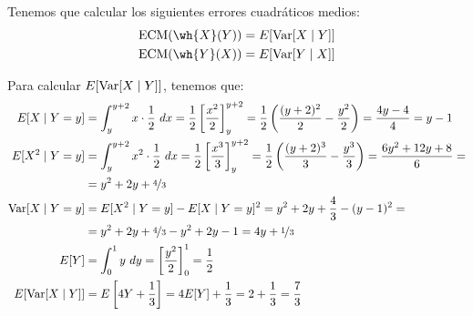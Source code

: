 \begin{ejercicio}
    Tenemos que calcular los siguientes errores cuadráticos medios:
    \begin{align*}
        \text{ECM}(\wh{X}(Y)) &= E[\Var[X\mid Y]]\\
        \text{ECM}(\wh{Y}(X)) &= E[\Var[Y\mid X]]
    \end{align*}

    Para calcular $E[\operatorname{Var}[X\mid Y]]$, tenemos que:
    \begin{align*}
        E[X\mid Y=y] &= \int_{y}^{y+2} x\cdot \dfrac{1}{2} \ dx
        = \dfrac{1}{2}\left[\dfrac{x^2}{2}\right]_{y}^{y+2}
        = \dfrac{1}{2}\left(\dfrac{(y+2)^2}{2}-\dfrac{y^2}{2}\right)
        = \dfrac{4y-4}{4} = y-1\\
        E[X^2\mid Y=y] &= \int_{y}^{y+2} x^2\cdot \dfrac{1}{2} \ dx
        = \dfrac{1}{2}\left[\dfrac{x^3}{3}\right]_{y}^{y+2}
        = \dfrac{1}{2}\left(\dfrac{(y+2)^3}{3}-\dfrac{y^3}{3}\right)
        = \dfrac{6y^2+12y+8}{6} =\\&= y^2+2y+\nicefrac{4}{3}\\
        \operatorname{Var}[X\mid Y=y] &= E[X^2\mid Y=y]-E[X\mid Y=y]^2
        = y^2+2y+\dfrac{4}{3}-(y-1)^2
        =\\&= y^2+2y+\nicefrac{4}{3}-y^2+2y-1
        = 4y+\nicefrac{1}{3}\\
        E[Y] &= \int_{0}^{1} y \ dy = \left[\dfrac{y^2}{2}\right]_{0}^{1} = \dfrac{1}{2}\\
        E[\operatorname{Var}[X\mid Y]] &= E\left[4Y+\dfrac{1}{3}\right] = 4E[Y]+\dfrac{1}{3} = 2+\dfrac{1}{3} = \dfrac{7}{3}
    \end{align*}

\end{ejercicio}

